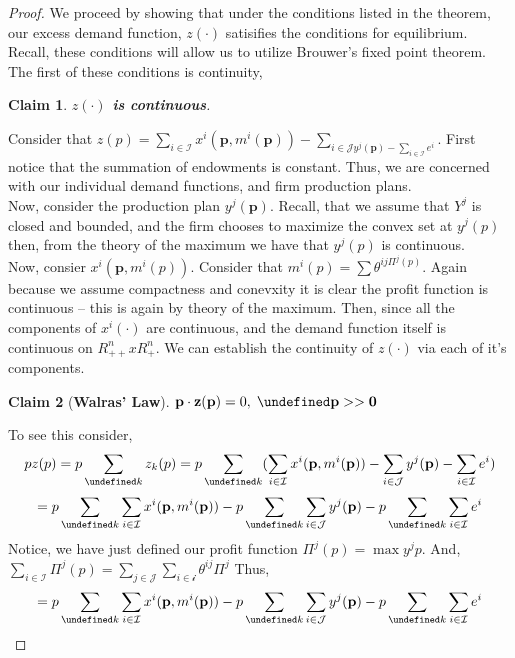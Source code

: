 \documentclass[dvips,11pt]{article}
\let\bf\oldbf
\let\bf\textbf
\let\oldforall\forall
\let\forall\undefined
\DeclareMathOperator{\forall}{\,\oldforall\,}
\DeclareMathOperator{\?}{\,?\,}
\newtheorem{claim}{Claim}[section]
\begin{document}
\begin{proof} We proceed by showing that under the conditions listed in the theorem, our excess demand function, $z(\cdot)$ satisifies the conditions for equilibrium. Recall, these conditions will allow us to utilize Brouwer's fixed point theorem. The first of these conditions is continuity,
\begin{claim}\bf{$z(\cdot)$ is continuous}.
\end{claim}
Consider that $z(p) = \sum_{i \in \mathcal{I}}x^i(\textbf{p},m^i(\textbf{p}))-\sum_{i \in \mathcal{J}y^j(\textbf{p}) - \sum_{i\in\mathcal{I}}e^i}$. First notice that the summation of endowments is constant. Thus, we are concerned with our individual demand functions, and firm production plans.
\\ Now, consider the production plan $y^j(\bf{p})$. Recall, that we assume that $Y^j$ is closed and bounded, and the firm chooses to maximize the convex set at $y^j(p)$ then, from the theory of the maximum we have that $y^j(p)$ is continuous. 
\\ Now, consier $x^i(\textbf{p}, m^i(p))$. Consider that $m^i(p) = \sum\theta^{ij\Pi^j(p)}$. Again because we assume compactness and conevxity it is clear the profit function is continuous -- this is again by theory of the maximum. Then, since all the components of $x^i(\cdot)$ are continuous, and the demand function itself is continuous on $R^n_{++} x R^n_+$. We can establish the continuity of $z(\cdot)$ via each of it's components.

\begin{claim}[\bf{Walras' Law}]
$\bf p\cdot \bf z(\bf p) = 0, \; \forall \bf p >> \bf 0$
\end{claim}
To see this consider,
$$pz(p) = p\sum_{\forall k}z_k(p) = p\sum_{\forall k}(\sum_{i \in \mathcal{I}}x^i(\textbf{p},m^i(\textbf{p}))-\sum_{i \in \mathcal{J}}y^j(\textbf{p}) - \sum_{i\in\mathcal{I}}e^i)$$
$$ = p\sum_{\forall k}\sum_{i \in \mathcal{I}}x^i(\textbf{p},m^i(\textbf{p}))-p\sum_{\forall k}\sum_{i \in \mathcal{J}}y^j(\textbf{p}) - p\sum_{\forall k}\sum_{i\in\mathcal{I}}e^i$$
Notice, we have just defined our profit function $\Pi^j(p) = \max y^j p$. And, $\sum_{i \in \mathcal{I}}\Pi^j(p) = \sum_{j \in \mathcal{J}}\sum_{i \in \mathcal{i}}\theta^{ij}\Pi^j$ Thus,
$$ = p\sum_{\forall k}\sum_{i \in \mathcal{I}}x^i(\textbf{p},m^i(\textbf{p}))-p\sum_{\forall k}\sum_{i \in \mathcal{J}}y^j(\textbf{p}) - p\sum_{\forall k}\sum_{i\in\mathcal{I}}e^i$$
\end{proof}
\end{document}
